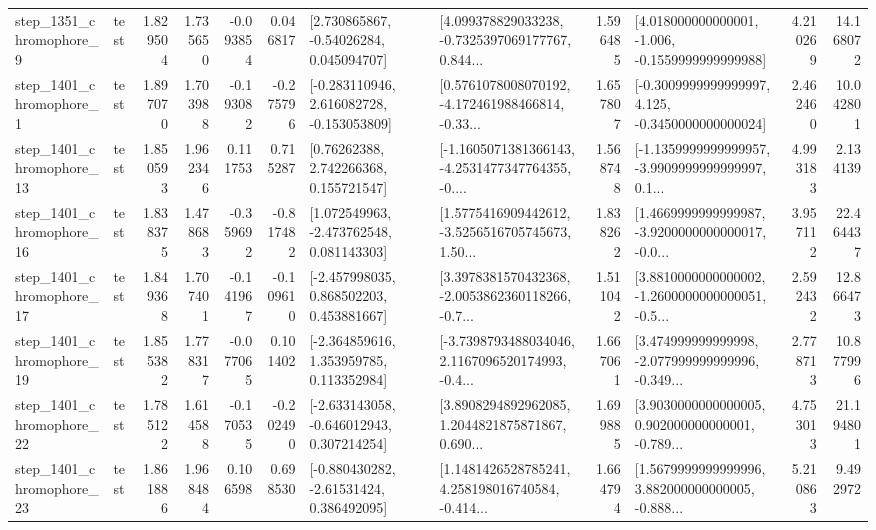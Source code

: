 \begin{tabular}{llrrrrllrlrr}
  step\_1351\_chromophore\_9 &      test &      1.829504 &    1.735650 &     -0.093854 &  0.046817 &     [2.730865867, -0.54026284, 0.045094707] &  [4.099378829033238, -0.7325397069177767, 0.844... &       1.596485 &   [4.018000000000001, -1.006, -0.1559999999999988] &            4.210269 &         14.168072 \\
  step\_1401\_chromophore\_1 &      test &      1.897070 &    1.703988 &     -0.193082 & -0.275796 &   [-0.283110946, 2.616082728, -0.153053809] &  [0.5761078008070192, -4.172461988466814, -0.33... &       1.657807 &  [-0.3009999999999997, 4.125, -0.3450000000000024] &            2.462460 &         10.042801 \\
 step\_1401\_chromophore\_13 &      test &      1.850593 &    1.962346 &      0.111753 &  0.715287 &      [0.76262388, 2.742266368, 0.155721547] &  [-1.1605071381366143, -4.2531477347764355, -0.... &       1.568748 &  [-1.1359999999999957, -3.9909999999999997, 0.1... &            4.993183 &          2.134139 \\
 step\_1401\_chromophore\_16 &      test &      1.838375 &    1.478683 &     -0.359692 & -0.817482 &    [1.072549963, -2.473762548, 0.081143303] &  [1.5775416909442612, -3.5256516705745673, 1.50... &       1.838262 &  [1.4669999999999987, -3.9200000000000017, -0.0... &            3.957112 &         22.464437 \\
 step\_1401\_chromophore\_17 &      test &      1.849368 &    1.707401 &     -0.141967 & -0.109610 &    [-2.457998035, 0.868502203, 0.453881667] &  [3.3978381570432368, -2.0053862360118266, -0.7... &       1.511042 &  [3.8810000000000002, -1.2600000000000051, -0.5... &            2.592432 &         12.866473 \\
 step\_1401\_chromophore\_19 &      test &      1.855382 &    1.778317 &     -0.077065 &  0.101402 &    [-2.364859616, 1.353959785, 0.113352984] &  [-3.7398793488034046, 2.1167096520174993, -0.4... &       1.667061 &  [3.474999999999998, -2.077999999999996, -0.349... &            2.778713 &         10.877996 \\
 step\_1401\_chromophore\_22 &      test &      1.785122 &    1.614588 &     -0.170535 & -0.202490 &   [-2.633143058, -0.646012943, 0.307214254] &  [3.8908294892962085, 1.2044821875871867, 0.690... &       1.699885 &  [3.9030000000000005, 0.902000000000001, -0.789... &            4.753013 &         21.194801 \\
 step\_1401\_chromophore\_23 &      test &      1.861886 &    1.968484 &      0.106598 &  0.698530 &    [-0.880430282, -2.61531424, 0.386492095] &  [1.1481426528785241, 4.258198016740584, -0.414... &       1.664794 &  [1.5679999999999996, 3.882000000000005, -0.888... &            5.210863 &          9.492972 \\

\end{tabular}
